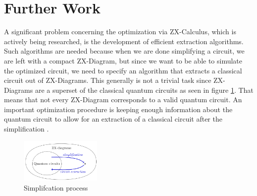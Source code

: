 \section{Further Work}

A significant problem concerning the optimization via ZX-Calculus, which is actively being researched, is the development of efficient extraction algorithms. Such algorithms are needed because when we are done simplifying a circuit, we are left with a compact ZX-Diagram, but since we want to be able to simulate the optimized circuit, we need to specify an algorithm that extracts a classical circuit out of ZX-Diagrams. This generally is not a trivial task since ZX-Diagrams are a superset of the classical quantum circuits\cite{duncan2020simplification} as seen in figure \ref{fig:extraction}. That means that not every ZX-Diagram corresponds to a valid quantum circuit. An important optimization procedure is keeping enough information about the quantum circuit to allow for an extraction of a classical circuit after the simplification \cite{duncan2020simplification}.

\begin{figure}[h]
    \centering
    \includegraphics[width=0.35\textwidth]{images/extraction.png}
    \caption{Simplifcation process\cite{duncan2020simplification}}
    \label{fig:extraction}
\end{figure}